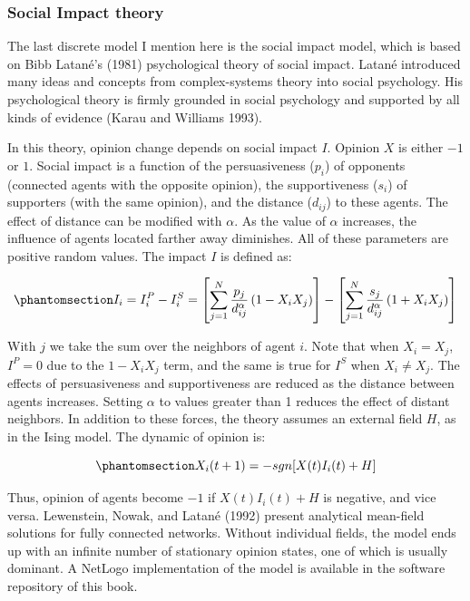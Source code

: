 \documentclass[
  a4paper,
  DIV=11,
  numbers=noendperiod,
  oneside]{scrreprt}
\begin{document}
\subsubsection{Social Impact theory}\label{sec-Social-Impact-theory}

The last discrete model I mention here is the social impact model, which
is based on Bibb Latané's (1981) psychological theory of social impact.
Latané introduced many ideas and concepts from complex-systems theory
into social psychology. His psychological theory is firmly grounded in
social psychology and supported by all kinds of evidence (Karau and
Williams 1993).

In this theory, opinion change depends on social impact \(I\). Opinion
\(X\) is either \(-1\) or \(1\). Social impact is a function of the
persuasiveness (\(p_{i}\)) of opponents (connected agents with the
opposite opinion), the supportiveness (\(s_{i}\)) of supporters (with
the same opinion), and the distance (\(d_{ij}\)) to these agents. The
effect of distance can be modified with \(\alpha\). As the value of
\(\alpha\) increases, the influence of agents located farther away
diminishes. All of these parameters are positive random values. The
impact \(I\) is defined as:

\begin{equation}\phantomsection\label{eq-ch7-SI-a}{I_{i} = I_{i}^{P} - I_{i}^{S} = \left\lbrack \sum_{j = 1}^{N}{\frac{p_{j}}{d_{ij}^{\alpha}}\left( 1 - X_{i}X_{j} \right)} \right\rbrack - \left\lbrack \sum_{j = 1}^{N}{\frac{s_{j}}{d_{ij}^{\alpha}}\left( 1 + X_{i}X_{j} \right)} \right\rbrack}\end{equation}

With \(j\) we take the sum over the neighbors of agent \(i\). Note that
when \(X_{i} = X_{j}\), \(I^{P} = 0\) due to the \(1 - X_{i}X_{j}\)
term, and the same is true for \(I^{S}\) when \(X_{i} \neq X_{j}\). The
effects of persuasiveness and supportiveness are reduced as the distance
between agents increases. Setting \(\alpha\) to values greater than 1
reduces the effect of distant neighbors. In addition to these forces,
the theory assumes an external field \(H\), as in the Ising model. The
dynamic of opinion is:

\begin{equation}\phantomsection\label{eq-ch7-SI-b}{X_{i}(t + 1) = - sgn\lbrack X(t)I_{i}(t) + H\rbrack}\end{equation}

Thus, opinion of agents become \(-1\) if \(X(t)I_{i}(t) + H\) is
negative, and vice versa. Lewenstein, Nowak, and Latané (1992) present
analytical mean-field solutions for fully connected networks. Without
individual fields, the model ends up with an infinite number of
stationary opinion states, one of which is usually dominant. A NetLogo
implementation of the model is available in the software repository of
this book.
\end{document}
